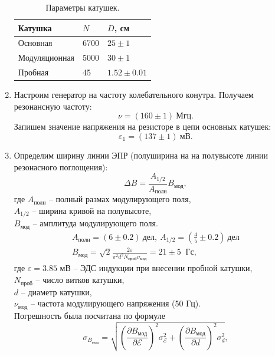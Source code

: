 \documentclass[a4paper,12pt]{article}
\begin{document}
\begin{enumerate}
	    \begin{table}[h]
	    \label{table:coils}
	    \centering
            \begin{tabular}{|l|l|l|}
            \hline
            \textbf{Катушка} & $N$ & $D$, см \\ \hline \hline
            Основная         & 6700         & $25\pm1$             \\ \hline
            Модуляционная    & 5000         & $30\pm1$             \\ \hline
            Пробная          & 45           & $1.52\pm0.01$             \\ \hline
            \end{tabular}
            \caption{Параметры катушек.}
        \end{table}
\item 
		Настроим генератор на частоту колебательного конутра. Получаем резонансную частоту:
		\begin{equation*}
			\nu = (160 \pm 1) \ \text{Мгц}.			
		\end{equation*}
		Запишем значение напряжения на резисторе в цепи основных катушек:
		\begin{equation*}
					\varepsilon_1
 = (137 \pm 1) \ \text{мВ}.
		\end{equation*}
\item Определим ширину линии ЭПР (полуширина на на полувысоте линии резонасного поглощения):
		\begin{equation*}
			\Delta B = \frac{A_{1/2}}{A_{\text{полн}}}B_\text{мод},
		\end{equation*}
		где $A_\text{полн}$ -- полный размах модулирующего поля, \\$A_{1/2}$ -- ширина кривой на полувысоте,\\ $B_\text{мод}$ -- амплитуда модулирующего поля.
		\begin{equation*}
			\begin{gathered}
				A_\text{полн} = (6 \pm 0.2 ) \ \text{дел}, \ A_{1/2} = (\frac{4}{5} \pm 0.2) \ \text{дел} \\
				B_\text{мод} = \sqrt{2} \frac{2\varepsilon}{\pi^2d^2N_{\text{проб}}\nu_{\text{мод}}} = 21\pm 5\;\; \text{Гс},
			\end{gathered}
		\end{equation*}
		где $\varepsilon = 3.85$ мВ -- ЭДС индукции при внесении пробной катушки,\\ $N_{\text{проб}}$ -- число витков катушки,\\ $d$ -- диаметр катушки,\\ $\nu_{\text{мод}}$ -- частота модулирующего напряжения (50 Гц).\\
		Погрешность была посчитана по формуле
\[\sigma_{B_{\text{мод}}}=\sqrt{\left(\dfrac{\partial B_{\text{мод}}}{\partial \mathcal{E}} \right)^2 \sigma^2_\mathcal{E} + \left(\dfrac{\partial B_{\text{мод}}}{\partial d} \right)^2 \sigma^2_{d}},\]


\end{enumerate}
\end{document}
